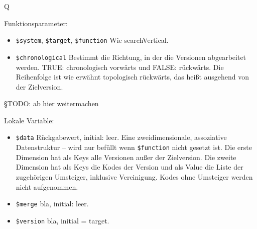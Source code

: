 Q


Funktionsparameter:

\begin{itemize}
\item \texttt{\$system}, \texttt{\$target}, \texttt{\$function}  \newline Wie searchVertical. 
\item \texttt{\$chronological}
\newline Bestimmt die Richtung, in der die Versionen abgearbeitet werden. TRUE: chronologisch vorwärts und FALSE: rückwärts. Die Reihenfolge ist wie erwähnt topologisch rückwärts, das heißt ausgehend von der Zielversion. 
\end{itemize}

{\color{blue} §TODO: ab hier weitermachen}

Lokale Variable:

\begin{itemize}
\item \texttt{\$data} \hspace{2em} Rückgabewert, initial: leer.
\newline Eine zweidimensionale, assoziative Datenstruktur -- wird nur befüllt wenn \texttt{\$function} nicht gesetzt ist. Die erste Dimension hat als Keys alle Versionen außer der Zielversion. Die zweite Dimension hat als Keys die Kodes der Version und als Value die Liste der zugehörigen Umsteiger, inklusive Vereinigung. Kodes ohne Umsteiger werden nicht aufgenommen.
\item \texttt{\$merge} \newline bla, initial: leer.
\item \texttt{\$version} \newline bla, initial = target.
\end{itemize}






